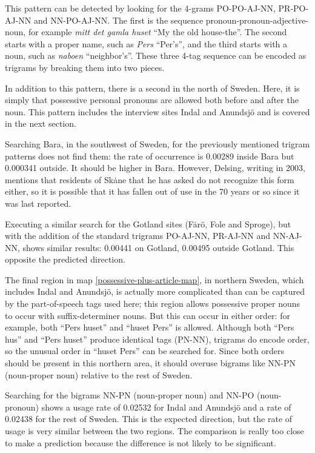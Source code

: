 This pattern can be detected by looking for the
4-grams PO-PO-AJ-NN, PR-PO-AJ-NN and NN-PO-AJ-NN. The first is the
sequence pronoun-pronoun-adjective-noun, for example {\it mitt det
  gamla huset} ``My the old house-the''. The second starts with a
proper name, such as {\it Pers} ``Per's'', and the third starts with a
noun, such as {\it naboen} ``neighbor's''. These three 4-tag sequence
can be encoded as trigrams by breaking them into two pieces.

In addition to this pattern, there is a second in the north of
Sweden. Here, it is simply that possessive personal pronouns are
allowed both before and after the noun. This pattern includes the
interview sites Indal and Anundsj\"o and is covered in the next
section.

Searching Bara, in the southwest of Sweden, for the previously
mentioned trigram patterns does not find them: the rate of occurrence
is 0.00289 inside Bara but 0.000341 outside. It should be higher in
Bara. However, Delsing, writing in 2003, mentions that residents of
Sk\.ane that he has asked do not recognize this form either, so it is
possible that it has fallen out of use in the 70 years or so since it
was last reported.

Executing a similar search for the Gotland sites (F\.ar\"o, Fole and
Sproge), but with the addition of the standard trigrams PO-AJ-NN,
PR-AJ-NN and NN-AJ-NN, shows similar results: 0.00441 on Gotland,
0.00495 outside Gotland. This opposite the predicted direction.

The final region in map \ref{possessive-plus-article-map}, in northern
Sweden, which includes Indal and Anundsj\"o, is actually more
complicated than can be captured by the part-of-speech tags used here;
this region allows possessive proper nouns to occur with
suffix-determiner nouns. But this can occur in either order: for
example, both ``Pers huset'' and ``huset Pers'' is allowed. Although
both ``Pers hus'' and ``Pers huset'' produce identical tags (PN-NN),
trigrams do encode order, so the unusual order in ``huset Pers'' can be
searched for. Since both orders should be present in this northern
area, it should overuse bigrams like NN-PN (noun-proper noun) relative
to the rest of Sweden.

Searching for the bigrams NN-PN (noun-proper noun) and NN-PO
(noun-pronoun) shows a usage rate of 0.02532 for Indal and Anundsj\"o
and a rate of 0.02438 for the rest of Sweden. This is the expected
direction, but the rate of usage is very similar between the two
regions. The comparison is really too close to make a prediction
because the difference is not likely to be significant.

